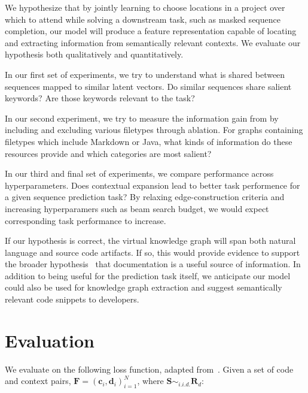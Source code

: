 \documentclass[11pt]{article}
\begin{document}
We hypothesize that by jointly learning to choose locations in a project over which to attend while solving a downstream task, such as masked sequence completion, our model will produce a feature representation capable of locating and extracting information from semantically relevant contexts. We evaluate our hypothesis both qualitatively and quantitatively.

In our first set of experiments, we try to understand what is shared between sequences mapped to similar latent vectors. Do similar sequences share salient keywords? Are those keywords relevant to the task?

In our second experiment, we try to measure the information gain from by including and excluding various filetypes through ablation. For graphs containing filetypes which include Markdown or Java, what kinds of information do these resources provide and which categories are most salient?


In our third and final set of experiments, we compare performance across hyperparameters. Does contextual expansion lead to better task performence for a given sequence prediction task? By relaxing edge-construction criteria and increasing hyperparamers such as beam search budget, we would expect corresponding task performance to increase.

If our hypothesis is correct, the virtual knowledge graph will span both natural language and source code artifacts. If so, this would provide evidence to support the broader hypothesis~\citep{guo2017semantically} that documentation is a useful source of information. In addition to being useful for the prediction task itself, we anticipate our model could also be used for knowledge graph extraction and suggest semantically relevant code snippets to developers.

\section{Evaluation}

We evaluate on the following loss function, adapted from~\citep{husain2019codesearchnet}. Given a set of code and context pairs, $\mathbf{F} = (\mathbf{c}_i, \mathbf{d}_i)_{i = 1}^N$, where $\mathbf S \sim_{i.i.d.} \mathbf R_{d}$:
\end{document}
